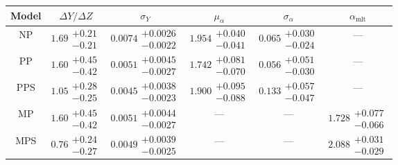 \begin{tabular}{cccccc}
\toprule
\textbf{Model} &              $\Delta Y/\Delta Z$ &                             $\sigma_Y$ &                        $\mu_\alpha$ &                     $\sigma_\alpha$ &               $\alpha_\mathrm{mlt}$ \\
\midrule
            NP &  $1.69\substack{+0.21 \\ -0.21}$ &  $0.0074\substack{+0.0026 \\ -0.0022}$ &  $1.954\substack{+0.040 \\ -0.041}$ &  $0.065\substack{+0.030 \\ -0.024}$ &                                 --- \\
            PP &  $1.60\substack{+0.45 \\ -0.42}$ &  $0.0051\substack{+0.0045 \\ -0.0027}$ &  $1.742\substack{+0.081 \\ -0.070}$ &  $0.056\substack{+0.051 \\ -0.030}$ &                                 --- \\
           PPS &  $1.05\substack{+0.28 \\ -0.25}$ &  $0.0045\substack{+0.0038 \\ -0.0023}$ &  $1.900\substack{+0.095 \\ -0.088}$ &  $0.133\substack{+0.057 \\ -0.047}$ &                                 --- \\
            MP &  $1.60\substack{+0.45 \\ -0.42}$ &  $0.0051\substack{+0.0044 \\ -0.0027}$ &                                 --- &                                 --- &  $1.728\substack{+0.077 \\ -0.066}$ \\
           MPS &  $0.76\substack{+0.24 \\ -0.27}$ &  $0.0049\substack{+0.0039 \\ -0.0025}$ &                                 --- &                                 --- &  $2.088\substack{+0.031 \\ -0.029}$ \\
\bottomrule
\end{tabular}
